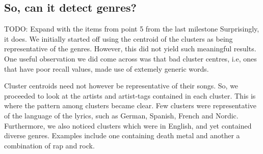 \documentclass[10pt,a4paper, twocolumn]{article}
\begin{document}
  \subsection{So, can it detect genres?}
  TODO: Expand with the items from point 5 from the last milestone
  Surprisingly, it does.
  We initially started off using the centroid of the clusters as being representative of the genres.
  However, this did not yield such meaningful results.
  One useful observation we did come across was that bad cluster centres, i.e, ones that have poor recall values, made use of extemely generic words.
  
  Cluster centroids need not however be representative of their songs.
  So, we proceeded to look at the artists and artist-tags contained in each cluster.
  This is where the pattern among clusters became clear.
  Few clusters were representative of the language of the lyrics, such as German, Spanish, French and Nordic.
  Furthermore, we also noticed clusters which were in English, and yet contained diverse genres.
  Examples include one containing death metal and another a combination of rap and rock.
  
  \printbibliography
\end{document}
